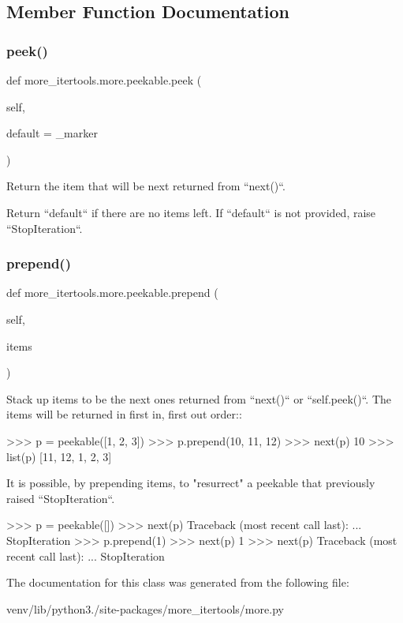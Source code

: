 \subsection{Member Function Documentation}
\mbox{\label{classmore__itertools_1_1more_1_1peekable_ad5d8e5b83e714b20e81f17225ebfcb83}} 
\subsubsection{\texorpdfstring{peek()}{peek()}}
{\footnotesize\ttfamily def more\+\_\+itertools.\+more.\+peekable.\+peek (\begin{DoxyParamCaption}\item[{}]{self,  }\item[{}]{default = {\ttfamily \+\_\+marker} }\end{DoxyParamCaption})}

\begin{DoxyVerb}Return the item that will be next returned from ``next()``.

Return ``default`` if there are no items left. If ``default`` is not
provided, raise ``StopIteration``.\end{DoxyVerb}
 \mbox{\label{classmore__itertools_1_1more_1_1peekable_a0defedea516792e72241c3c8f97d99b2}} 
\subsubsection{\texorpdfstring{prepend()}{prepend()}}
{\footnotesize\ttfamily def more\+\_\+itertools.\+more.\+peekable.\+prepend (\begin{DoxyParamCaption}\item[{}]{self,  }\item[{}]{items }\end{DoxyParamCaption})}

\begin{DoxyVerb}Stack up items to be the next ones returned from ``next()`` or
``self.peek()``. The items will be returned in
first in, first out order::

    >>> p = peekable([1, 2, 3])
    >>> p.prepend(10, 11, 12)
    >>> next(p)
    10
    >>> list(p)
    [11, 12, 1, 2, 3]

It is possible, by prepending items, to "resurrect" a peekable that
previously raised ``StopIteration``.

    >>> p = peekable([])
    >>> next(p)
    Traceback (most recent call last):
      ...
    StopIteration
    >>> p.prepend(1)
    >>> next(p)
    1
    >>> next(p)
    Traceback (most recent call last):
      ...
    StopIteration\end{DoxyVerb}
 

The documentation for this class was generated from the following file\+:\begin{DoxyCompactItemize}
\item 
venv/lib/python3./site-\/packages/more\+\_\+itertools/more.\+py\end{DoxyCompactItemize}
